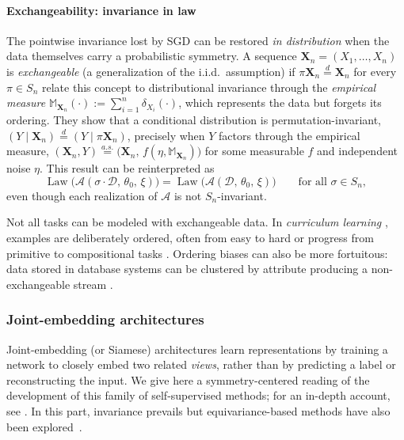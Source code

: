 \documentclass[mathematics,review,submit,moreauthors]{Definitions/mdpi}
\begin{document}
\paragraph{Exchangeability: invariance in law}\label{par:exchangeability}
The pointwise invariance lost by SGD can be restored \emph{in distribution} when the data themselves carry a probabilistic symmetry.
A sequence $\boldsymbol{X}_n=(X_1,\dots,X_n)$ is \emph{exchangeable} (a generalization of the i.i.d.\ assumption) if $\pi\boldsymbol{X}_n \overset{d}{=} \boldsymbol{X}_n$ for every $\pi\in S_n$
\citep{bloem-reddy2020} relate this concept to distributional invariance through the \emph{empirical measure} $\mathbb{M}_{\boldsymbol{X}_n}(\cdot):=\sum_{i=1}^{n}\delta_{X_i}(\cdot)$, which represents the data but forgets its ordering.
They show that a conditional distribution is permutation-invariant, $(Y \mid \boldsymbol{X}_n)\overset{d}{=}(Y \mid \pi\boldsymbol{X}_n)$, precisely when $Y$ factors through the empirical measure, $(\boldsymbol{X}_n, Y)\overset{a.s.}{=}\big(\boldsymbol{X}_n,\, f(\eta, \mathbb{M}_{\boldsymbol{X}_n})\big)$ for some measurable $f$ and independent noise $\eta$.
This result can be reinterpreted as
$$
\operatorname{Law}\big(\mathcal{A}(\sigma\cdot\mathcal{D},\,\theta_0,\,\xi)\big) = \operatorname{Law}\big(\mathcal{A}(\mathcal{D},\,\theta_0,\,\xi)\big) \qquad \text{for all } \sigma\in S_n,
$$
even though each realization of $\mathcal{A}$ is not $S_n$-invariant.

\begin{Remark}
    Not all tasks can be modeled with exchangeable data.
    In \emph{curriculum learning} \citep{bengio2009p2aicml}, examples are deliberately ordered, often from easy to hard or progress from primitive to compositional tasks \citep{lee2024}.
    Ordering biases can also be more fortuitous: data stored in database systems can be clustered by attribute producing a non-exchangeable stream \citep{xu2024vj}.
\end{Remark}

\subsubsection{Joint-embedding architectures}\label{sec:joint-embedding}

Joint-embedding (or Siamese) architectures learn representations by training a network to closely embed two related \emph{views}, rather than by predicting a label or reconstructing the input.
We give here a symmetry-centered reading of the development of this family of self-supervised methods; for an in-depth account, see \citet{ilina2022sa}.
In this part, invariance prevails but equivariance-based methods have also been explored~\citep{gupta2023a}.
\end{document}
